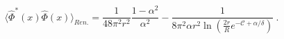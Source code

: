 \begin{equation}
\langle\hat{\Phi}^*(x)\hat{\Phi}(x)\rangle_{Ren.}=\frac1{48\pi^2r^2}\frac{1-\alpha^2
}{\alpha^2}
-\frac1{8\pi^2\alpha r^2\ln(\frac{2r}R e^{-{\mathcal{C}}+\alpha/\delta})} \ .
\label{42}
\end{equation}

